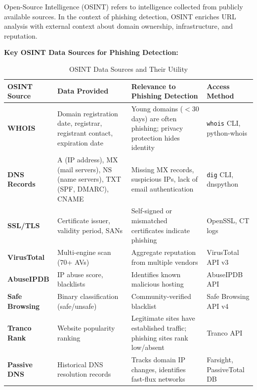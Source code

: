 Open-Source Intelligence (OSINT) refers to intelligence collected from
publicly available sources. In the context of phishing detection, OSINT
enriches URL analysis with external context about domain ownership,
infrastructure, and reputation.

\textbf{Key OSINT Data Sources for Phishing Detection:}

\setlength{\tabcolsep}{3pt}
\small
\begin{longtable}{
>{\raggedright\arraybackslash}p{}
>{\raggedright\arraybackslash}p{}
>{\raggedright\arraybackslash}p{}
>{\raggedright\arraybackslash}p{}}
\caption{OSINT Data Sources and Their Utility} \\
\toprule
OSINT Source & Data Provided & Relevance to Phishing Detection & Access Method \\
\midrule

\textbf{WHOIS} & Domain registration date, registrar, registrant
contact, expiration date & Young domains ($<$30 days) are often
phishing; privacy protection hides identity & \texttt{whois} CLI,
python-whois \\
\textbf{DNS Records} & A (IP address), MX (mail servers), NS (name
servers), TXT (SPF, DMARC), CNAME & Missing MX records, suspicious IPs,
lack of email authentication & \texttt{dig} CLI,
dnspython \\
\textbf{SSL/TLS} & Certificate issuer, validity period,
SANs & Self-signed or mismatched
certificates indicate phishing & OpenSSL, CT logs \\
\textbf{VirusTotal} & Multi-engine scan
(70+ AVs) & Aggregate reputation from multiple vendors &
VirusTotal API v3 \\
\textbf{AbuseIPDB} & IP abuse score,
blacklists & Identifies known malicious hosting & AbuseIPDB
API \\
\textbf{Safe Browsing} & Binary classification (safe/unsafe) &
Community-verified blacklist & Safe Browsing API v4 \\
\textbf{Tranco Rank} & Website popularity ranking & Legitimate
sites have established traffic; phishing sites rank low/absent & Tranco
API \\
\textbf{Passive DNS} & Historical DNS resolution records & Tracks domain
IP changes, identifies fast-flux networks & Farsight,
PassiveTotal DB \\

\bottomrule
\end{longtable}
\normalsize
\setlength{\tabcolsep}{6pt}

